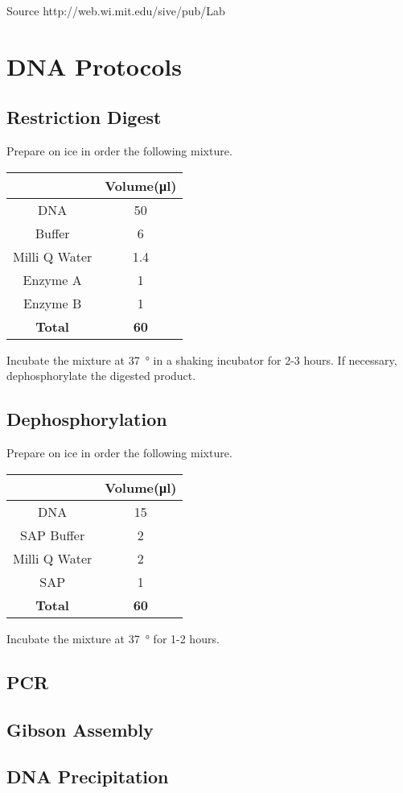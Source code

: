\documentclass[12pt,twoside]{article}
\begin{document}
Source http://web.wi.mit.edu/sive/pub/Lab%


\section{DNA Protocols}
\subsection{Restriction Digest}
Prepare on ice in order the following mixture.


\begin{center}
\begin{tabular}{c|c}
				&	\textbf{Volume(\si{\micro\litre})} 	\\\hline
DNA				&	50									\\
Buffer			&	6									\\
Milli Q Water	&	1.4									\\
Enzyme A			&	1									\\
Enzyme B			&	1									\\\hline
\textbf{Total}	&	\textbf{60}					
\end{tabular}
\end{center}

Incubate the mixture at \SI{37}{\degree} in a shaking incubator for 2-3 hours.
If necessary, dephosphorylate the digested product.

\subsection{Dephosphorylation}
Prepare on ice in order the following mixture.

\begin{center}
\begin{tabular}{c|c}
				&	\textbf{Volume(\si{\micro\litre})} 	\\\hline
DNA				&	15									\\
SAP Buffer		&	2									\\
Milli Q Water	&	2									\\
SAP				&	1									\\\hline
\textbf{Total}	&	\textbf{60}					
\end{tabular}
\end{center}

Incubate the mixture at \SI{37}{\degree} for 1-2 hours.

\subsection{PCR}

\subsection{Gibson Assembly}


\subsection{DNA Precipitation}
\end{document}
